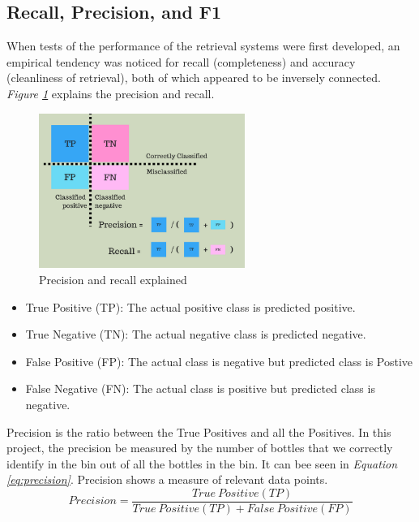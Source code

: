 \subsection{Recall, Precision, and F1}
When tests of the performance of the retrieval systems were first developed, an empirical tendency was noticed for recall (completeness) and accuracy (cleanliness of retrieval), both of which appeared to be inversely connected\cite{buckland_relationship_1994}. \textit{Figure \ref{fig:precisionrecall}} explains the precision and recall.

\begin{figure}[h]
    \centering
    \includegraphics[width=0.6\textwidth]{graphics/Precisionrecall.png}
    \caption{Precision and recall explained \cite{mittapally_whats_2019}}
    \label{fig:precisionrecall}
\end{figure}

\begin{itemize}
    \item True Positive (TP): The actual positive class is predicted positive.
    \item True Negative (TN): The actual negative class is predicted negative.
    \item False Positive (FP): The actual class is negative but predicted class is Postive
    \item False Negative (FN): The actual class is positive but predicted class is negative.
\end{itemize}


Precision is the ratio between the True Positives and all the Positives. In this project, the precision be measured by the number of bottles that we correctly identify in the bin out of all the bottles in the bin. It can bee seen in \textit{Equation \ref{eq:precision}}. Precision shows a measure of relevant data points\cite{shung_accuracy_2020}.
\begin{equation}
    Precision = \frac{True\ Positive(TP)}{True\ Positive(TP)+False \ Positive(FP)}
    \label{eq:precision}
\end{equation}


